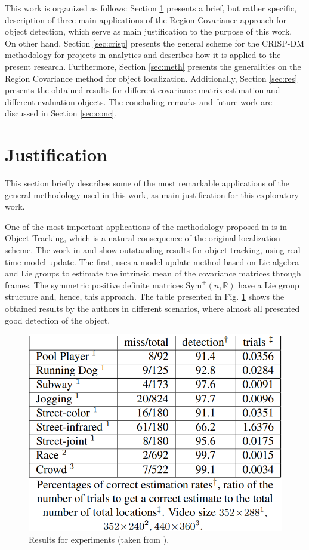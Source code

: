 \documentclass[11pt]{article}
\theoremstyle{definition}
\theoremstyle{remark}
\theoremstyle{remark}
\theoremstyle{remark}
\begin{document}
This work is organized as follows: Section \ref{sec:just} presents a brief, but
rather specific, description of three main applications of the Region Covariance
approach for object detection, which serve as main justification to the purpose
of this work. On other hand, Section \ref{sec:crisp} presents the general scheme
for the CRISP-DM methodology for projects in analytics and describes how it is
applied to the present research. Furthermore, Section \ref{sec:meth} presents
the generalities on the Region Covariance method for object localization.
Additionally, Section \ref{sec:res} presents the obtained results for different
covariance matrix estimation and different evaluation objects. The concluding
remarks and future work are discussed in Section \ref{sec:conc}.

\section{Justification}\label{sec:just}
This section briefly describes some of the most remarkable applications of the
general methodology used in this work, as main justification for this
exploratory work.

One of the most important applications of the methodology proposed in
\parencite{tuzel2006} is in Object Tracking, which is a natural consequence of
the original localization scheme. The work in \parencite{porikli2006covariance}
and \parencite{wu2012real} show outstanding results for object tracking, using
real-time model update. The first, uses a model update method based on Lie
algebra and Lie groups to estimate the intrinsic mean of the covariance matrices
through frames. The symmetric positive definite matrices
$\mathrm{Sym}^+(n,\mathbb{R})$ have a Lie group structure and, hence, this
approach. The table presented in Fig. \ref{fig:res_lie} shows the obtained
results by the authors in different scenarios, where almost all presented good
detection of the object.

\begin{figure}[H]
  \centering
  \caption{Results for experiments (taken from \cite{porikli2006covariance}).}
  \label{fig:res_lie}
  \includegraphics[scale=0.3]{res_lie.png}
\end{figure}
\end{document}
